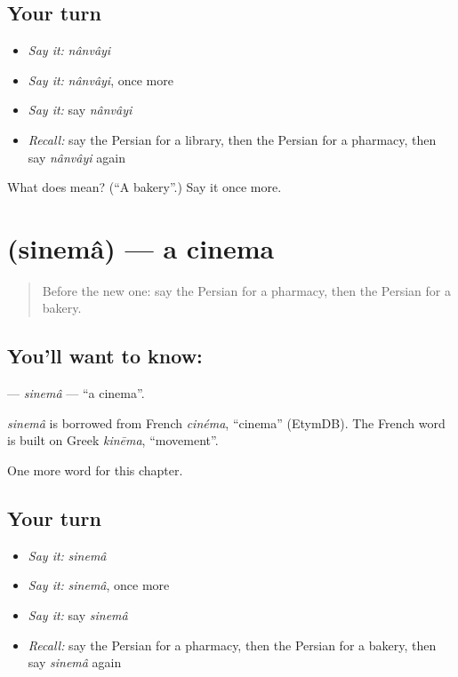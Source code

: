 \subsection*{Your turn}
\begin{itemize}
\raggedright
  \item \emph{Say it:} \emph{nânvâyi}
  \item \emph{Say it:} \emph{nânvâyi}, once more
  \item \emph{Say it:} say \emph{nânvâyi}
  \item \emph{Recall:} say the Persian for a library, then the Persian for a pharmacy, then say \emph{nânvâyi} again
\end{itemize}

\begin{tcolorbox}[breakable,colback=teal!4,colframe=teal!35!black,title={Before you move on}]
What does  mean? (\textquotedblleft{}A bakery\textquotedblright{}.) Say it once more.
\end{tcolorbox}
\section[\texorpdfstring{\fa{سینما} (sinemâ)}{سینما (sinemâ)}]{ (sinemâ) — a cinema}

\label{lesson:FA-C88-sinema}



\begin{quote}
Before the new one: say the Persian for a pharmacy, then the Persian for a bakery.
\end{quote}

\subsection*{You'll want to know: }
\textbf{} — \emph{sinemâ} — \textquotedblleft{}a cinema\textquotedblright{}.

\begin{cousinweb}
\emph{sinemâ} is borrowed from French \emph{cinéma}, \textquotedblleft{}cinema\textquotedblright{} (EtymDB). The French word is built on Greek \emph{kinēma}, \textquotedblleft{}movement\textquotedblright{}.
\end{cousinweb}

\begin{grammarlens}[title={What you've built}]
One more word for this chapter.
\end{grammarlens}

\subsection*{Your turn}
\begin{itemize}
\raggedright
  \item \emph{Say it:} \emph{sinemâ}
  \item \emph{Say it:} \emph{sinemâ}, once more
  \item \emph{Say it:} say \emph{sinemâ}
  \item \emph{Recall:} say the Persian for a pharmacy, then the Persian for a bakery, then say \emph{sinemâ} again
\end{itemize}


